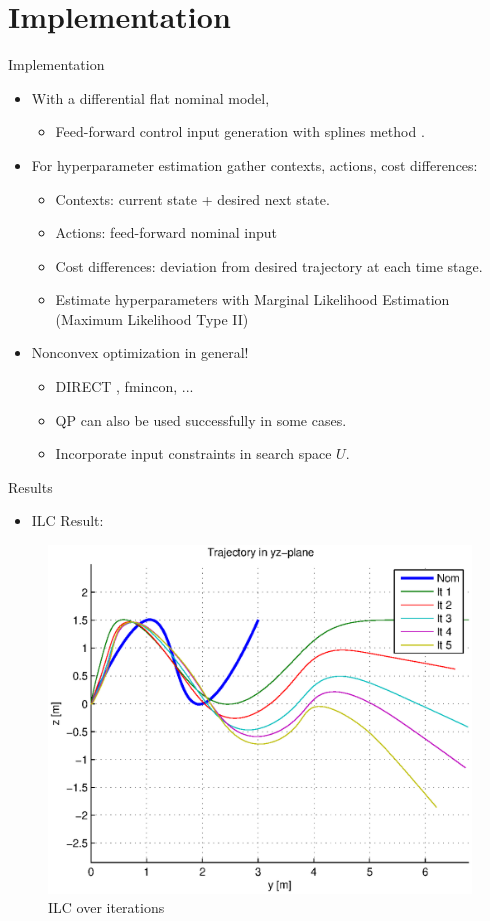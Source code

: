 \documentclass[handout]{beamer}
\begin{document}
\section{Implementation}
%
\begin{frame}{Implementation}
\begin{itemize}
\item With a differential flat nominal model, \pause
	\begin{itemize}
	\item Feed-forward control input generation with splines method \cite{ILC_Angela}. \pause
	\end{itemize}
\item For hyperparameter estimation gather contexts, actions, cost differences: \pause
	\begin{itemize}
	\item Contexts: current state + desired next state. \pause
	\item Actions: feed-forward nominal input \pause
	\item Cost differences: deviation from desired trajectory at each time stage. \pause
	\item Estimate hyperparameters with Marginal Likelihood Estimation (Maximum Likelihood Type II) \pause
	\end{itemize}
\item Nonconvex optimization in general! \pause
	\begin{itemize}
	\item DIRECT \cite{Jones:1993}, fmincon, ... \pause
	\item QP can also be used successfully in some cases.
	\item Incorporate input constraints in search space $U$.
	\end{itemize}
\end{itemize}
\end{frame}
%
\begin{frame}{Results}
\begin{itemize}
\item ILC Result: \pause
\end{itemize}
\begin{figure}
\center
\includegraphics[scale=0.40]{ILCwind_yz.eps}			
\caption{ILC over iterations}
\end{figure}
\end{frame}
%
\end{document}
